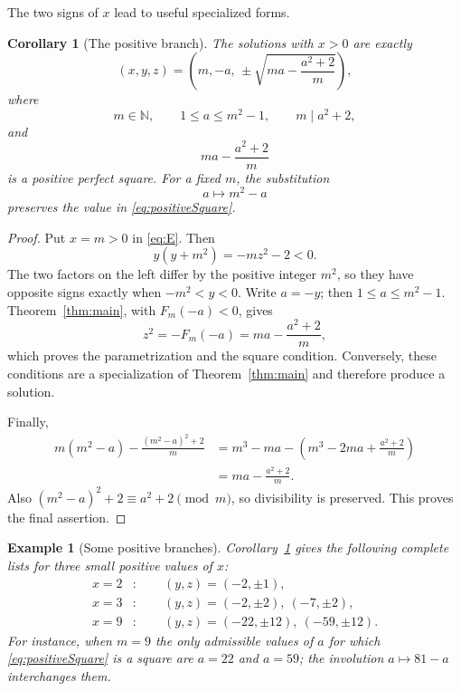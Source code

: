 \documentclass[11pt,a4paper]{amsart}
\numberwithin{equation}{section}
\newtheorem{corollary}[theorem]{Corollary}
\newtheorem{example}[theorem]{Example}
\theoremstyle{definition}
\newcommand{\N}{\mathbb N}
\begin{document}
The two signs of \(x\) lead to useful specialized forms.

\begin{corollary}[The positive branch]\label{cor:positivebranch}
The solutions with \(x>0\) are exactly
\begin{equation}
 (x,y,z)=
 \left(m,-a,\,\pm\sqrt{ma-\frac{a^2+2}{m}}\right),
 \label{eq:positiveparam}
\end{equation}
where
\begin{equation}
 m\in\N,\qquad 1\le a\le m^2-1,
 \qquad m\mid a^2+2,
 \label{eq:positiveconditions1}
\end{equation}
and
\begin{equation}
 ma-\frac{a^2+2}{m}
 \label{eq:positiveSquare}
\end{equation}
is a positive perfect square.
For a fixed \(m\), the substitution
\begin{equation}
 a\longmapsto m^2-a
 \label{eq:ainvolution}
\end{equation}
preserves the value in \eqref{eq:positiveSquare}.
\end{corollary}

\begin{proof}
Put \(x=m>0\) in \eqref{eq:E}.  Then
\begin{equation}
 y(y+m^2)=-mz^2-2<0.
 \label{eq:yrangeproof}
\end{equation}
The two factors on the left differ by the positive integer \(m^2\), so
they have opposite signs exactly when
\(-m^2<y<0\).  Write \(a=-y\); then
\(1\le a\le m^2-1\).  Theorem~\ref{thm:main}, with
\(F_m(-a)<0\), gives
\begin{equation*}
 z^2=-F_m(-a)=ma-\frac{a^2+2}{m},
\end{equation*}
which proves the parametrization and the square condition.  Conversely,
these conditions are a specialization of Theorem~\ref{thm:main} and
therefore produce a solution.

Finally,
\begin{align*}
 m(m^2-a)-\frac{(m^2-a)^2+2}{m}
 &=m^3-ma-\left(m^3-2ma+\frac{a^2+2}{m}\right)\\
 &=ma-\frac{a^2+2}{m}.
\end{align*}
Also \((m^2-a)^2+2\equiv a^2+2\pmod m\), so divisibility is
preserved.  This proves the final assertion.
\end{proof}


\begin{example}[Some positive branches]\label{ex:positivebranches}
Corollary~\ref{cor:positivebranch} gives the following complete lists
for three small positive values of $x$:
\begin{align*}
 x=2&:\qquad (y,z)=(-2,\pm1),\\
 x=3&:\qquad (y,z)=(-2,\pm2),\ (-7,\pm2),\\
 x=9&:\qquad (y,z)=(-22,\pm12),\ (-59,\pm12).
\end{align*}
For instance, when $m=9$ the only admissible values of $a$ for which
\eqref{eq:positiveSquare} is a square are $a=22$ and $a=59$; the
involution $a\mapsto81-a$ interchanges them.
\end{example}
\end{document}
